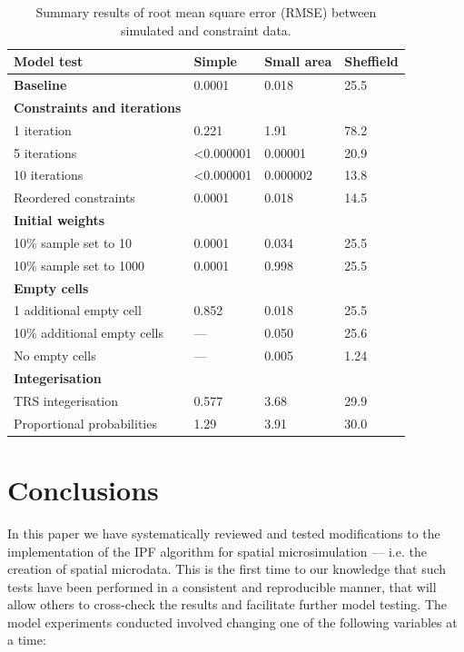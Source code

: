 \documentclass[a4paper,10pt]{article}
\begin{document}
\begin{table}[h]
\caption{Summary results of root mean square error (RMSE) between
simulated and constraint data.} \label{tsum}
\begin{center}
\begin{tabular}{llll}
\toprule
Model test & Simple & Small area  & Sheffield \\
\midrule
\textbf{Baseline} & 0.0001 & 0.018  & 25.5 \\
\midrule
\textbf{Constraints and iterations} &  &  & \\
1 iteration & 0.221 & 1.91 & 78.2 \\
5 iterations & \textless 0.000001 & 0.00001  & 20.9 \\
10 iterations & \textless 0.000001 & 0.000002  & 13.8 \\
Reordered constraints 		& 0.0001  & 0.018 & 14.5 \\ %
\midrule
\textbf{Initial weights} 	&  &  & \\
10\% sample set to 10  		& 0.0001 & 0.034  & 25.5\\
10\% sample set to 1000 	& 0.0001 & 0.998 & 25.5 \\
\midrule
\textbf{Empty cells} 		&  &  & \\
1 additional empty cell 	& 0.852 & 0.018  & 25.5 \\
10\% additional empty cells 	& --- & 0.050  & 25.6 \\
No empty cells			& --- & 0.005 & 1.24 \\
\midrule
\textbf{Integerisation} 	&  &  & \\
TRS integerisation		& 0.577 & 3.68  & 29.9 \\
Proportional probabilities & 1.29 & 3.91 & 30.0 \\
\bottomrule
\end{tabular}
\end{center}
\end{table}



\section{Conclusions}
In this paper we have systematically reviewed and tested modifications to the
implementation of the IPF algorithm for spatial microsimulation --- i.e. the creation
of spatial microdata. This is the first time
to our knowledge that such tests have been performed in a consistent and reproducible
manner, that will allow others to cross-check the results and facilitate
further model testing. The model experiments conducted involved changing one of the
following variables at a time:
\end{document}
